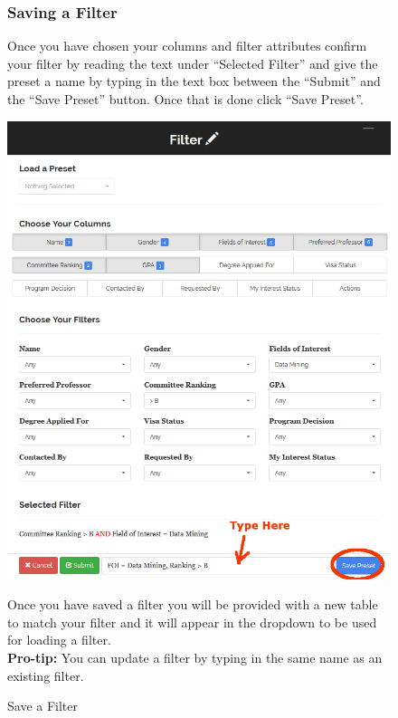 \documentclass[fontsize=12pt,paper=letter,twoside]{scrartcl}
\begin{document}
\begin{figure}[!htb]
\subsubsection{Saving a Filter}
Once you have chosen your columns and filter attributes confirm your filter by reading the text under ``Selected Filter'' and give the preset a name by typing in the text box between the ``Submit'' and the ``Save Preset'' button. Once that is done click ``Save Preset''.
\begin{center}
\includegraphics[width=.99\textwidth]{images/prof/save_filter.png}
\end{center}
\caption{Save a Filter}
Once you have saved a filter you will be provided with a new table to match your filter and it will appear in the dropdown to be used for loading a filter.\\
\textbf{Pro-tip:} You can update a filter by typing in the same name as an existing filter.
\label{fig:prof/save_filter}
\end{figure}
\end{document}
